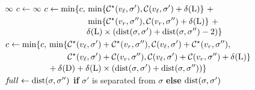 \begin{algorithm}[htb!]
    \begin{algorithmic}
                \Return \(\infty\)
            \Else
                \State \(c \gets \infty\)
                        \State \(c \gets \min\{c, \begin{aligned}[t]
                            &\min\{\mathcal{C^\star}(v_\mathit{\ell}, \sigma'),
                                 \mathcal{C}(v_\mathit{\ell}, \sigma') + \delta\kern.1pt(\mathrm{L})\}\ +\\
                            &\min\{\mathcal{C^\star}(v_r, \sigma''),
                                 \mathcal{C}(v_r, \sigma'') + \delta\kern.1pt(\mathrm{L})\}\ +\\[-.25em]
                            &\delta\kern.1pt(\mathrm{L}) \times
                            (\mathrm{dist}(\sigma, \sigma') +
                            \mathrm{dist}(\sigma, \sigma'') - 2)\}
                        \end{aligned}\)
                        \State \(c \gets \min\{c, \begin{aligned}[t]
                            &\min\{
                            \begin{aligned}[t]
                                &\mathcal{C^\star}(v_\mathit{\ell}, \sigma') + \mathcal{C^\star}(v_r, \sigma''),
                                \mathcal{C}(v_\mathit{\ell}, \sigma') + \mathcal{C^\star}(v_r, \sigma''),\\
                                &\mathcal{C^\star}(v_\mathit{\ell}, \sigma') + \mathcal{C}(v_r, \sigma''),
                                \mathcal{C}(v_\mathit{\ell}, \sigma') + \mathcal{C}(v_r, \sigma'') + \delta\kern.1pt(\mathrm{L})
                                \}
                            \end{aligned}\\[-.25em]
                            &+ \delta\kern.1pt(\mathrm{D}) + \delta\kern.1pt(\mathrm{L}) \times
                            (\mathrm{dist}(\sigma, \sigma') +
                            \mathrm{dist}(\sigma, \sigma''))\}
                        \end{aligned}\)
                        \State \(f\!ull \gets \mathrm{dist}(\sigma, \sigma'')\) \textbf{if} \(\sigma'\) is separated from \(\sigma\) \textbf{else} \(\mathrm{dist}(\sigma, \sigma')\)

\end{algorithmic}
\end{algorithm}
